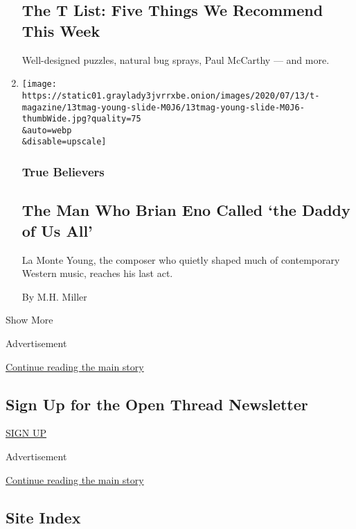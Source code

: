 \begin{enumerate}
  \hypertarget{the-t-list-five-things-we-recommend-this-week-4}{%
  \subsection{The T List: Five Things We Recommend This
  Week}\label{the-t-list-five-things-we-recommend-this-week-4}}

  Well-designed puzzles, natural bug sprays, Paul McCarthy --- and more.
\item
  \href{/2020/07/22/t-magazine/la-monte-young.html}{}

  \texttt{[image: https://static01.graylady3jvrrxbe.onion/images/2020/07/13/t-magazine/13tmag-young-slide-M0J6/13tmag-young-slide-M0J6-thumbWide.jpg?quality=75\\\&auto=webp\\\&disable=upscale]}

  \hypertarget{true-believers}{%
  \subsubsection{True Believers}\label{true-believers}}

  \hypertarget{the-man-who-brian-eno-called-the-daddy-of-us-all}{%
  \subsection{The Man Who Brian Eno Called `the Daddy of Us
  All'}\label{the-man-who-brian-eno-called-the-daddy-of-us-all}}

  La Monte Young, the composer who quietly shaped much of contemporary
  Western music, reaches his last act.

  By M.H. Miller
\end{enumerate}

Show More

Advertisement

\protect\hyperlink{after-mid2}{Continue reading the main story}

\hypertarget{sign-up-for-the-open-thread-newsletter}{%
\subsection{Sign Up for the Open Thread
Newsletter}\label{sign-up-for-the-open-thread-newsletter}}

\href{/newsletters/signup/TZ}{SIGN UP}

Advertisement

\protect\hyperlink{after-mktg}{Continue reading the main story}

\hypertarget{site-index}{%
\subsection{Site Index}\label{site-index}}

